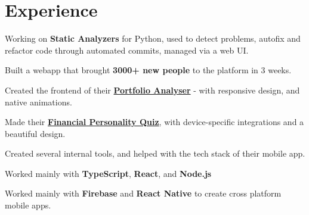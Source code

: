 \documentclass[]{resume}
\begin{document}
\begin{minipage}[t]{0.62\textwidth} 


\section{Experience}
\vspace{\topsep} %
\begin{tightemize}
\item Working on \textbf{Static Analyzers} for Python, used to detect problems, autofix and refactor code through automated commits, managed via a web UI.
\end{tightemize}
\sectionsep

\begin{tightemize}
\item Built a webapp that brought \textbf{3000+ new people} to the platform in 3 weeks.
\item Created the frontend of their  \href{https://jupiter.money/portfolio-analyser}{\textbf{Portfolio Analyser}} - with responsive design, and native animations.
\item Made their \href{https://jupiter.money/quiz}{\textbf{Financial Personality Quiz}}, with device-specific integrations and a beautiful design.
\item Created several internal tools, and helped with the tech stack of their mobile app.
\item Worked mainly with \textbf{TypeScript}, \textbf{React}, and \textbf{Node.js}
\end{tightemize}
\sectionsep

\begin{tightemize}
\item Worked mainly with \textbf{Firebase} and \textbf{React Native} to create cross platform mobile apps.
\end{tightemize}
\sectionsep



\end{minipage}
\end{document}
